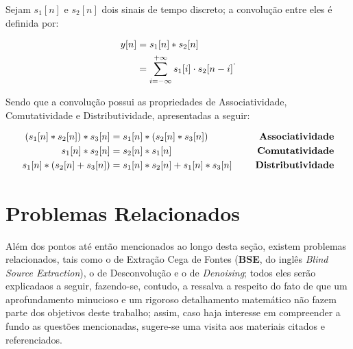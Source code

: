 \begin{definition}[Convolução]
    Sejam $s_{1}[n]$ e $s_{2}[n]$ dois sinais de tempo discreto; a convolução entre eles é definida por:

    \begin{equation}
    \begin{aligned}
        y[n]    & = s_{1}[n] \ast s_{2}[n] \\
                & = \sum_{i=-\infty}^{+\infty} s_{1}[i]\cdot s_{2}[n - i]
    \end{aligned}
    \vspace{0.2cm}.
    \end{equation}

    \noindent Sendo que a convolução possui as propriedades de Associatividade, Comutatividade e Distributividade, apresentadas a seguir:

    \begin{equation*}
    \begin{aligned}
        (s_{1}[n] \ast s_{2}[n]) \ast s_{3}[n] & =  s_{1}[n] \ast (s_{2}[n] \ast s_{3}[n]) & \hspace{0.5cm}\text{\textbf{Associatividade}} \\
        s_{1}[n] \ast s_{2}[n] & = s_{2}[n] \ast s_{1}[n] & \hspace{0.5cm}\text{\textbf{Comutatividade}} \\
        s_{1}[n] \ast (s_{2}[n] + s_{3}[n]) & = s_{1}[n] \ast s_{2}[n] + s_{1}[n] \ast s_{3}[n] & \hspace{0.5cm}\text{\textbf{Distributividade}}
    \end{aligned}
    \vspace{0.2cm}
    \end{equation*}

\end{definition}





\section{Problemas Relacionados}
\label{sec:bss_correlated_problems}

Além dos pontos até então mencionados ao longo desta seção, existem problemas relacionados, tais como o de Extração Cega de Fontes (\textbf{BSE}, do inglês \textit{Blind Source Extraction}), o de Desconvolução e o de \textit{Denoising}; todos eles serão explicadaos a seguir, fazendo-se, contudo, a ressalva a respeito do fato de que um aprofundamento minucioso e um rigoroso detalhamento matemático não fazem parte dos objetivos deste trabalho; assim, caso haja interesse em compreender a fundo as questões mencionadas, sugere-se uma visita aos materiais citados e referenciados.




